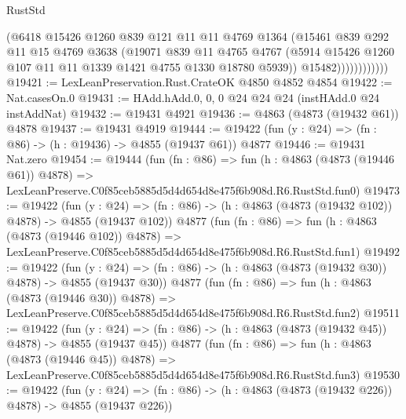 \begin{lexlean}{RustStd}
\begin{coremodule}
                        (@6418
                          @15426
                          @1260
                          @839
                          @121
                          @11
                          @11
                          @4769
                          @1364
                          (@15461
                            @839
                            @292
                            @11
                            @15
                            @4769
                            @3638
                            (@19071
                              @839
                              @11
                              @4765
                              @4767
                              (@5914
                                @15426
                                @1260
                                @107
                                @11
                                @11
                                @1339
                                @1421
                                @4755
                                @1330
                                @18780
                                @5939))
                            @15482))))))))))))
@19421 := LexLeanPreservation.Rust.CrateOK @4850 @4852 @4854
@19422 := Nat.casesOn.{0}
@19431 := HAdd.hAdd.{0, 0, 0} @24 @24 @24 (instHAdd.{0} @24 instAddNat)
@19432 := @19431 @4921
@19436 := @4863 (@4873 (@19432 @61)) @4878
@19437 := @19431 @4919
@19444 := @19422 (fun (y : @24) => (fn : @86) -> (h : @19436) -> @4855 (@19437 @61)) @4877
@19446 := @19431 Nat.zero
@19454 := @19444
    (fun (fn : @86) =>
    fun (h : @4863 (@4873 (@19446 @61)) @4878) =>
    LexLeanPreserve.C0f85ceb5885d5d4d654d8e475f6b908d.R6.RustStd.fun0)
@19473 := @19422
    (fun (y : @24) => (fn : @86) -> (h : @4863 (@4873 (@19432 @102)) @4878) -> @4855 (@19437 @102))
    @4877
    (fun (fn : @86) =>
    fun (h : @4863 (@4873 (@19446 @102)) @4878) =>
    LexLeanPreserve.C0f85ceb5885d5d4d654d8e475f6b908d.R6.RustStd.fun1)
@19492 := @19422
    (fun (y : @24) => (fn : @86) -> (h : @4863 (@4873 (@19432 @30)) @4878) -> @4855 (@19437 @30))
    @4877
    (fun (fn : @86) =>
    fun (h : @4863 (@4873 (@19446 @30)) @4878) =>
    LexLeanPreserve.C0f85ceb5885d5d4d654d8e475f6b908d.R6.RustStd.fun2)
@19511 := @19422
    (fun (y : @24) => (fn : @86) -> (h : @4863 (@4873 (@19432 @45)) @4878) -> @4855 (@19437 @45))
    @4877
    (fun (fn : @86) =>
    fun (h : @4863 (@4873 (@19446 @45)) @4878) =>
    LexLeanPreserve.C0f85ceb5885d5d4d654d8e475f6b908d.R6.RustStd.fun3)
@19530 := @19422
    (fun (y : @24) => (fn : @86) -> (h : @4863 (@4873 (@19432 @226)) @4878) -> @4855 (@19437 @226))

\end{coremodule}
\end{lexlean}
